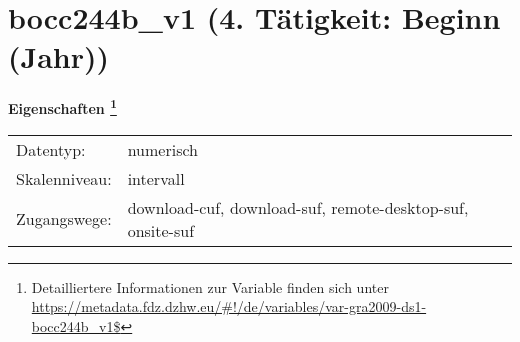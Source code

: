 
    \setcounter{footnote}{0}

    \vspace*{-1.8cm}
	\section{bocc244b\_v1 (4. Tätigkeit: Beginn (Jahr))}
	\label{section:bocc244b_v1}



    \vspace*{0.5cm}
    \noindent\textbf{Eigenschaften
	\footnote{Detailliertere Informationen zur Variable finden sich unter
		\url{https://metadata.fdz.dzhw.eu/\#!/de/variables/var-gra2009-ds1-bocc244b_v1$}}}\\
	\begin{tabularx}{\hsize}{@{}lX}
	Datentyp: & numerisch \\
	Skalenniveau: & intervall \\
	Zugangswege: &
	  download-cuf, 
	  download-suf, 
	  remote-desktop-suf, 
	  onsite-suf
 \\
    \end{tabularx}




